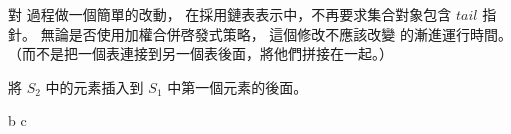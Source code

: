 \startEXERCISE
對  過程做一個簡單的改動，
在採用鏈表表示中，不再要求集合對象包含 $tail$ 指針。
無論是否使用加權合併啓發式策略，
這個修改不應該改變  的漸進運行時間。
（\hint 而不是把一個表連接到另一個表後面，將他們拼接在一起。）
\stopEXERCISE

\startANSWER
將 $S_2$ 中的元素插入到 $S_1$ 中第一個元素的後面。

{\externalfigure[e19_2-6-2]}{b}
{\externalfigure[e19_2-6-3]}{c}
{}{}
\stopcombination
\stopANSWER